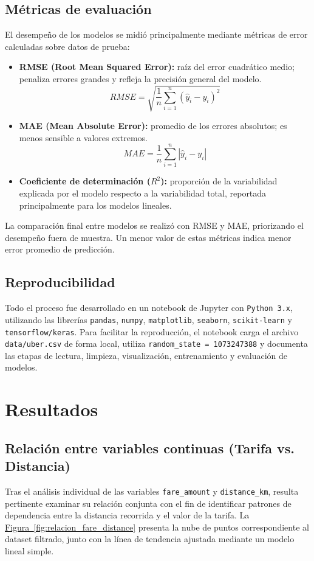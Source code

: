 \documentclass[10pt]{article}
\newcommand{\figuraref}[1]{\hyperref[#1]{Figura~\ref*{#1}}}
\begin{document}
	\subsection{Métricas de evaluación}
	El desempeño de los modelos se midió principalmente mediante métricas de error calculadas sobre datos de prueba:
	\begin{itemize}
		\item \textbf{RMSE (Root Mean Squared Error):} raíz del error cuadrático medio; penaliza errores grandes y refleja la precisión general del modelo.
		\[
		RMSE = \sqrt{\frac{1}{n}\sum_{i=1}^{n}(\hat{y}_i - y_i)^2}
		\]
		\item \textbf{MAE (Mean Absolute Error):} promedio de los errores absolutos; es menos sensible a valores extremos.
		\[
		MAE = \frac{1}{n}\sum_{i=1}^{n}|\hat{y}_i - y_i|
		\]
		\item \textbf{Coeficiente de determinación ($R^2$):} proporción de la variabilidad explicada por el modelo respecto a la variabilidad total, reportada principalmente para los modelos lineales.
	\end{itemize}
	La comparación final entre modelos se realizó con RMSE y MAE, priorizando el desempeño fuera de muestra. Un menor valor de estas métricas indica menor error promedio de predicción.

	\subsection{Reproducibilidad}
	Todo el proceso fue desarrollado en un notebook de Jupyter con \texttt{Python 3.x}, utilizando las librerías \texttt{pandas}, \texttt{numpy}, \texttt{matplotlib}, \texttt{seaborn}, \texttt{scikit-learn} y \texttt{tensorflow/keras}. Para facilitar la reproducción, el notebook carga el archivo \texttt{data/uber.csv} de forma local, utiliza \texttt{random\_state = 1073247388} y documenta las etapas de lectura, limpieza, visualización, entrenamiento y evaluación de modelos.

	\section{Resultados}

	\subsection{Relación entre variables continuas (Tarifa vs. Distancia)}

	Tras el análisis individual de las variables \texttt{fare\_amount} y \texttt{distance\_km}, resulta pertinente examinar su relación conjunta con el fin de identificar patrones de dependencia entre la distancia recorrida y el valor de la tarifa. La \figuraref{fig:relacion_fare_distance} presenta la nube de puntos correspondiente al dataset filtrado, junto con la línea de tendencia ajustada mediante un modelo lineal simple.
\end{document}
